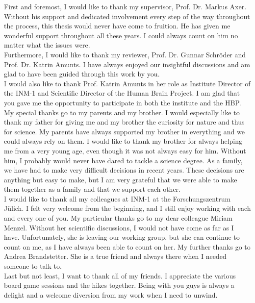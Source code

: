 \label{sec:acknowledgement}
% 
First and foremost, I would like to thank my supervisor, Prof. Dr. Markus Axer.
Without his support and dedicated involvement every step of the way throughout the process, this thesis would never have come to fruition. 
He has given me wonderful support throughout all these years.
I could always count on him no matter what the issues were.
\\
% 
Furthermore, I would like to thank my reviewer, Prof. Dr. Gunnar Schr{\"o}der and Prof. Dr. Katrin Amunts.
I have always enjoyed our insightful discussions and am glad to have been guided through this work by you. 
\\
% 
I would also like to thank Prof. Katrin Amunts in her role as Institute Director of the INM-1 and Scientific Director of the Human Brain Project.
I am glad that you gave me the opportunity to participate in both the institute and the HBP.
\\
% 
My special thanks go to my parents and my brother.
I would especially like to thank my father for giving me and my brother the curiosity for nature and thus for science.
My parents have always supported my brother in everything and we could always rely on them.
I would like to thank my brother for always helping me from a very young age, even though it was not always easy for him.
Without him, I probably would never have dared to tackle a science degree.
As a family, we have had to make very difficult decisions in recent years.
These decisions are anything but easy to make, but I am very grateful that we were able to make them together as a family and that we support each other.
\\
% 
I would like to thank all my colleagues at INM-1 at the Forschungszentrum J{\"u}lich.
I felt very welcome from the beginning, and I still enjoy working with each and every one of you.
My particular thanks go to my dear colleague Miriam Menzel.
Without her scientific discussions, I would not have come as far as I have.
Unfortunately, she is leaving our working group, but she can continue to count on me, as I have always been able to count on her.
My further thanks go to Andrea Brandstetter.
She is a true friend and always there when I needed someone to talk to.
\\
% 
Last but not least, I want to thank all of my friends.
I appreciate the various board game sessions and the hikes together.
Being with you guys is always a delight and a welcome diversion from my work when I need to unwind. 